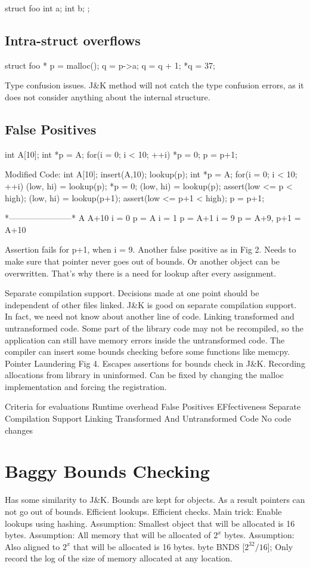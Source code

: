 \documentclass[11pt]{article} %
\begin{document}
struct foo{
    int a;
    int b;
};

\subsection {Intra-struct overflows}
struct foo * p = malloc();
q = p->a;
q = q + 1;
*q = 37;

Type confusion issues. J\&K method will not catch the type confusion errors, as
it does not consider anything about the internal structure.

\subsection {False Positives}
int A[10];
int *p = A;
for(i = 0; i < 10; ++i){
   *p = 0;
   p = p+1;
}

Modified Code:
int A[10];
insert(A,10);
lookup(p);
int *p = A;
for(i = 0; i < 10; ++i){
   (low, hi) = lookup(p);
   *p = 0;
   (low, hi) = lookup(p);
   assert(low <= p < high);
   (low, hi) = lookup(p+1);
   assert(low <= p+1 < high);
   p = p+1;
}

*-----------------------*
A                       A+10
i = 0                   p = A
i = 1                   p = A+1
i = 9                   p = A+9, p+1 = A+10

Assertion fails for p+1, when i = 9.
Another false positive as in Fig 2.
Needs to make sure that pointer never goes out of bounds. Or another object can
be overwritten. That's why there is a need for lookup after every assignment.

Separate compilation support.
Decisions made at one point should be independent of other files linked. J\&K is
good on separate compilation support. In fact, we need not know about another
line of code.
Linking transformed and untransformed code.
Some part of the library code may not be recompiled, so the application can
still have memory errors inside the untransformed code. The compiler can
insert some bounds checking before some functions like memcpy.
Pointer Laundering
Fig 4. Escapes assertions for bounds check in J\&K.
Recording allocations from library in uninformed. Can be fixed by changing the
malloc implementation and forcing the registration.

Criteria for evaluations
Runtime overhead
False Positives
EFfectiveness
Separate Compilation Support
Linking Transformed And Untransformed Code
No code changes

\section {Baggy Bounds Checking}
Has some similarity to J\&K. Bounds are kept for objects.
As a result pointers can not go out of bounds. 
Efficient lookups.
Efficient checks.
Main trick: Enable lookups using hashing.
Assumption: Smallest object that will be allocated is 16 bytes.
Assumption: All memory that will be allocated of $2^x$ bytes.
Assumption: Also aligned to $2^x$ that will be allocated is 16 bytes.
byte BNDS [$2^{32}/16$];
Only record the log of the size of memory allocated at any
location.
\end{document}
